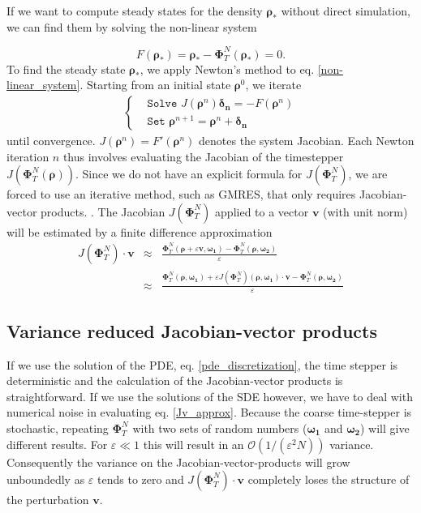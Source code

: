 \documentclass[]{article}
\newcommand{\R}{\ensuremath{\mathbb{R}}} %
\newcommand{\U}{\ensuremath{\boldsymbol{\rho}}}
\newcommand{\cts}{\ensuremath{\boldsymbol{\Phi}^N_T}} %
\newcommand{\V}{\ensuremath{\mathbf{v}}}
\theoremstyle{definition}
\begin{document}
If we want to compute steady states for the density $\U_*$ without direct simulation, we can find them by solving the non-linear system

\begin{equation}
  {F}(\U_*) = \U_* - \cts(\U_*) =0. \label{non-linear_system}
\end{equation}
To find the steady state $\U_*$, we apply Newton's method to eq. \ref{non-linear_system}. Starting from an initial state $\U^0$, we iterate %
\begin{eqnarray}
\begin{cases}
& \texttt{Solve         }  J(\U^n) \boldsymbol{\delta_n}  =  - {F}(\U^n) \label{linear_system}        \\          
& \texttt{Set     } \U^{n+1} = \U^n+ \boldsymbol{\delta_n} 
\end{cases}
\end{eqnarray}
until convergence. 
$J(\U^n) =   F'(\U^n)  $ denotes the system Jacobian. Each Newton iteration $n$ thus involves evaluating the Jacobian of the timestepper $J(\cts(\U))$.
Since we do not have an explicit formula for $J(\cts)$, we are forced to use an iterative method, such as GMRES, that only requires Jacobian-vector products. %
 \cite{Brown_Krylov}.
The Jacobian $J(\cts)$ applied to a vector $\mathbf{v}$ (with unit norm) will be estimated by a finite difference approximation
\begin{eqnarray}
\label{Jv_approx}
J(\cts) \cdot \mathbf{v} &\approx& \frac{\cts (\U + \varepsilon \mathbf{v}, \boldsymbol{\omega_1} )  - \cts (\U, \boldsymbol{\omega_2})}{\varepsilon} \\
&\approx & \frac{\cts (\U, \boldsymbol{\omega_1} )  + \varepsilon J(\cts) (  \U, \boldsymbol{\omega_1})  \cdot \mathbf{v}  - \cts (\U, \boldsymbol{\omega_2}) }{\varepsilon} \nonumber
\end{eqnarray}



\subsection{Variance reduced Jacobian-vector products}

If we use the solution of the PDE, eq. \eqref{pde_discretization}, the time stepper is deterministic and the calculation of the Jacobian-vector products is straightforward. If we use the solutions of the SDE however, we have to deal with numerical noise in evaluating eq. \ref{Jv_approx}.
Because the coarse time-stepper is stochastic, repeating $\cts$ with two sets of random numbers ($\boldsymbol{\omega_1}$ and $ \boldsymbol{\omega_2}$)  will give different results. For $ \varepsilon \ll 1$ this will result in an $\mathcal{O}(1/(\varepsilon^2 N))$ variance. Consequently the variance on the Jacobian-vector-products will grow unboundedly as $\varepsilon$ tends to zero and $J(\cts) \cdot \mathbf{v}$ completely loses the structure of the perturbation \V.
\end{document}
